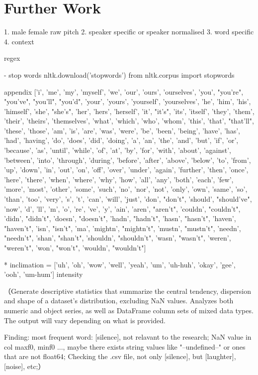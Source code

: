 \section{Further Work}
1. male female raw pitch
2. speaker specific or speaker normalised
3. word specific
4. context

regex

- stop words
nltk.download('stopwords')
from nltk.corpus import stopwords

appendix
['i', 'me', 'my', 'myself', 'we', 'our', 'ours', 'ourselves', 'you', "you're", "you've", "you'll", "you'd", 'your', 'yours', 'yourself', 'yourselves', 'he', 'him', 'his', 'himself', 'she', "she's", 'her', 'hers', 'herself', 'it', "it's", 'its', 'itself', 'they', 'them', 'their', 'theirs', 'themselves', 'what', 'which', 'who', 'whom', 'this', 'that', "that'll", 'these', 'those', 'am', 'is', 'are', 'was', 'were', 'be', 'been', 'being', 'have', 'has', 'had', 'having', 'do', 'does', 'did', 'doing', 'a', 'an', 'the', 'and', 'but', 'if', 'or', 'because', 'as', 'until', 'while', 'of', 'at', 'by', 'for', 'with', 'about', 'against', 'between', 'into', 'through', 'during', 'before', 'after', 'above', 'below', 'to', 'from', 'up', 'down', 'in', 'out', 'on', 'off', 'over', 'under', 'again', 'further', 'then', 'once', 'here', 'there', 'when', 'where', 'why', 'how', 'all', 'any', 'both', 'each', 'few', 'more', 'most', 'other', 'some', 'such', 'no', 'nor', 'not', 'only', 'own', 'same', 'so', 'than', 'too', 'very', 's', 't', 'can', 'will', 'just', 'don', "don't", 'should', "should've", 'now', 'd', 'll', 'm', 'o', 're', 've', 'y', 'ain', 'aren', "aren't", 'couldn', "couldn't", 'didn', "didn't", 'doesn', "doesn't", 'hadn', "hadn't", 'hasn', "hasn't", 'haven', "haven't", 'isn', "isn't", 'ma', 'mightn', "mightn't", 'mustn', "mustn't", 'needn', "needn't", 'shan', "shan't", 'shouldn', "shouldn't", 'wasn', "wasn't", 'weren', "weren't", 'won', "won't", 'wouldn', "wouldn't"]

* inclimation = ['uh', 'oh', 'wow', 'well', 'yeah', 'um', 'uh-huh', 'okay', 'gee', 'ooh', 'um-hum']
intensity


（Generate descriptive statistics that summarize the central tendency, dispersion and shape of a dataset's distribution, excluding NaN values.
Analyzes both numeric and object series, as well as DataFrame column sets of mixed data types. The output will vary depending on what is provided.

Finding:
most frequent word: [silence], not relavant to the research;
NaN value in col maxf0, minf0 ..., maybe there exists string values like "--undefined--" or ones that are not float64;
Checking the .csv file, not only [silence], but [laughter], [noise], etc;）



